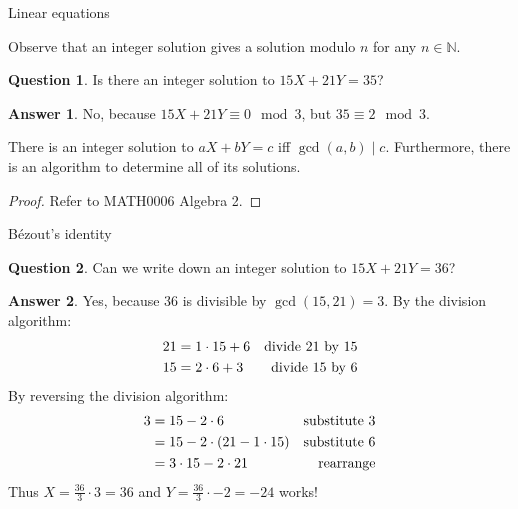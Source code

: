 \documentclass[10pt]{beamer}
\theoremstyle{definition}
\newtheorem{answer}{Answer}
\newtheorem{question}{Question}
\begin{document}
\begin{frame}[t]{Linear equations}

Observe that an integer solution gives a solution modulo $ n $ for any $ n \in \mathbb{N} $.

\vspace{0.5cm}

\begin{question}
Is there an integer solution to $ 15X + 21Y = 35 $?
\end{question}

\begin{answer}
No, because $ 15X + 21Y \equiv 0 \mod 3 $, but $ 35 \equiv 2 \mod 3 $.
\end{answer}

\vspace{0.5cm}

\begin{theorem}
There is an integer solution to $ aX + bY = c $ iff $ \gcd(a, b) \mid c $. Furthermore, there is an algorithm to determine all of its solutions.
\end{theorem}

\begin{proof}
Refer to MATH0006 Algebra 2.
\end{proof}

\end{frame}

\begin{frame}[t]{B\'ezout's identity}

\begin{question}
Can we write down an integer solution to $ 15X + 21Y = 36 $?
\end{question}

\begin{answer}
Yes, because $ 36 $ is divisible by $ \gcd(15, 21) = 3 $. By the division algorithm:
\begin{align*}
21 & = 1 \cdot 15 + 6 & \text{divide $ 21 $ by $ 15 $} \\
15 & = 2 \cdot 6 + 3 & \text{divide $ 15 $ by $ 6 $}
\end{align*}
By reversing the division algorithm:
\begin{align*}
3 & = 15 - 2 \cdot 6 & \text{substitute $ 3 $} \\
& = 15 - 2 \cdot (21 - 1 \cdot 15) & \text{substitute $ 6 $} \\
& = 3 \cdot 15 - 2 \cdot 21 & \text{rearrange}
\end{align*}
Thus $ X = \tfrac{36}{3} \cdot 3 = 36 $ and $ Y = \tfrac{36}{3} \cdot -2 = -24 $ works!
\end{answer}

\end{frame}
\end{document}

